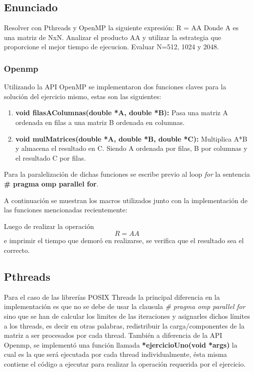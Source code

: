 \subsection{Enunciado}

Resolver con Pthreads y OpenMP la siguiente expresión: R = AA
Donde A es una matriz de NxN. Analizar el producto AA y utilizar la
estrategia que proporcione el mejor tiempo de ejecucion.
Evaluar N=512, 1024 y 2048.
 
\subsubsection{Openmp}
Utilizando la API OpenMP se implementaron dos funciones claves para la solución del ejercicio mismo, estas son las siguientes:

\begin{enumerate}
\item \textbf{void filasAColumnas(double *A, double *B):} Pasa una matriz A ordenada en filas a una matriz B ordenada en columnas.
\item \textbf{void mulMatrices(double *A, double *B, double *C):} Multiplica A*B y almacena el resultado en C. Siendo A ordenada por filas, B por columnas y el resultado C por filas.
\end{enumerate}

Para la paralelización de dichas funciones se escribe previo al loop \textit{for} la sentencia \textbf{\# pragma omp parallel for}.

A continuación se muestran los macros utilizados junto con la implementación de las funciones mencionadas recientemente:


Luego de realizar la operación $$R = AA$$ e imprimir el tiempo que demoró en realizarse, se verifica que el resultado sea el correcto.

\subsection{Pthreads}

Para el caso de las librerías POSIX Threads la principal diferencia en la implementación es que no se debe de usar la clausula \textit{\# pragma omp parallel for} sino que se han de calcular los limites de las iteraciones y asignarles dichos límites a los threads, es decir en otras palabras, redistribuir la carga/componentes de la matriz a ser procesados por cada thread. También a diferencia de la API Openmp, se implementó una función llamada \textbf{*ejercicioUno(void *args)} la cual es la que será ejecutada por cada thread individualmente, ésta misma contiene el código a ejecutar para realizar la operación requerida por el ejercicio.


